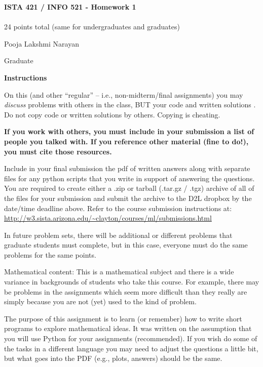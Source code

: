 \documentclass[10pt]{article}
\begin{document}
\begin{center}
    {\Large {\bf ISTA 421 / INFO 521 - Homework 1}} \\
     \\
    24 points total (same for undergraduates and graduates) \\
    \vspace{1cm}
\end{center}

\begin{flushright}
Pooja Lakshmi Narayan  %

Graduate %
\end{flushright}

\vspace{1cm}

{\Large {\bf Instructions}}

On this (and other ``regular'' -- i.e., non-midterm/final assignments) you may {\em discuss} problems with others in the class, BUT your code and written solutions .  Do not copy code or written solutions by others.  Copying is cheating.

{\bf If you work with others, you must include in your submission a list of people you talked with.  If you reference other material (fine to do!), you must cite those resources.}

Include in your final submission the pdf of written answers along with separate files for any python scripts that you write in support of answering the questions. 
You are required to create either a .zip or tarball (.tar.gz / .tgz) archive of all of the files for your submission and submit the archive to the D2L dropbox by the date/time deadline above.
Refer to the course submission instructions at: \\
\url{http://w3.sista.arizona.edu/~clayton/courses/ml/submissions.html}

In future problem sets, there will be additional or different problems that graduate students must complete, but in this case, everyone must do the same problems for the same points.

Mathematical content: This is a mathematical subject and there is a wide variance in backgrounds of students who take this course. For example, there may be problems in the assignments which seem more difficult than they really are simply because you are not (yet) used to the kind of problem. 

The purpose of this assignment is to learn (or remember) how to write short programs to explore mathematical ideas. It was written on the assumption that you will use Python for your assignments (recommended). If you wish do some of the tasks in a different language you may need to adjust the questions a little bit, but what goes into the PDF (e.g., plots, answers) should be the same. 
\end{document}
